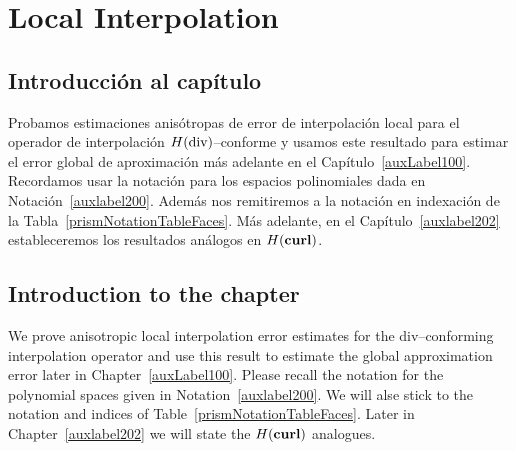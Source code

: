 \chapter{Local Interpolation}
\section*{Introducci\'on al cap\'itulo}
Probamos estimaciones anis\'otropas de error de interpolaci\'on local
para el operador de interpolaci\'on
$H(\operatorname{\textrm{div}})$--conforme
y usamos este resultado para estimar el error global de aproximaci\'on
m\'as adelante en el Cap\'itulo~\ref{auxLabel100}. 
Recordamos usar la notaci\'on para los espacios polinomiales
dada en Notaci\'on~\ref{auxlabel200}. Adem\'as nos remitiremos a la
notaci\'on en indexaci\'on de la Tabla~\ref{prismNotationTableFaces}.
M\'as adelante, en el Cap\'itulo~\ref{auxlabel202} 
estableceremos los resultados an\'alogos en $H(\textbf{curl})$.
\section*{Introduction to the chapter}
We prove anisotropic local interpolation error estimates
for the div--conforming interpolation
operator
and use this result to estimate the global approximation error later
in Chapter~\ref{auxLabel100}. 
Please recall 
the notation for the polynomial spaces given in Notation~\ref{auxlabel200}. We 
will alse stick to the notation and indices of Table~\ref{prismNotationTableFaces}.
Later in Chapter~\ref{auxlabel202} we will state the $H(\textbf{curl})$ analogues.




